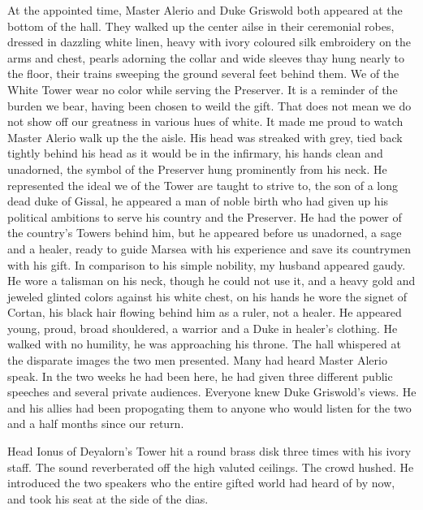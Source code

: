 \documentclass{article}
\begin{document}
At the appointed time, Master Alerio and Duke Griswold both appeared at the bottom of the hall. They walked up the center ailse in their ceremonial robes, dressed in dazzling white linen, heavy with ivory coloured silk embroidery on the arms and chest, pearls adorning the collar and wide sleeves thay hung nearly to the floor, their trains sweeping the ground several feet behind them. We of the White Tower wear no color while serving the Preserver. It is a reminder of the burden we bear, having been chosen to weild the gift. That does not mean we do not show off our greatness in various hues of white. It made me proud to watch Master Alerio walk up the the aisle. His head was streaked with grey, tied back tightly behind his head as it would be in the infirmary, his hands clean and unadorned, the symbol of the Preserver hung prominently from his neck. He represented the ideal we of the Tower are taught to strive to, the son of a long dead duke of Gissal, he appeared a man of noble birth who had given up his political ambitions to serve his country and the Preserver. He had the power of the country's Towers behind him, but he appeared before us unadorned, a sage and a healer, ready to guide Marsea with his experience and save its countrymen with his gift. In comparison to his simple nobility, my husband appeared gaudy. He wore a talisman on his neck, though he could not use it, and a heavy gold and jeweled glinted colors against his white chest, on his hands he wore the signet of Cortan, his black hair flowing behind him as a ruler, not a healer. He appeared young, proud, broad shouldered, a warrior and a Duke in healer's clothing. He walked with no humility, he was approaching his throne. The hall whispered at the disparate images the two men presented. Many had heard Master Alerio speak. In the two weeks he had been here, he had given three different public speeches and several private audiences. Everyone knew Duke Griswold's views. He and his allies had been propogating them to anyone who would listen for the two and a half months since our return. 

Head Ionus of Deyalorn's Tower hit a round brass disk three times with his ivory staff. The sound reverberated off the high valuted ceilings. The crowd hushed. He introduced the two speakers who the entire gifted world had heard of by now, and took his seat at the side of the dias.
\end{document}
